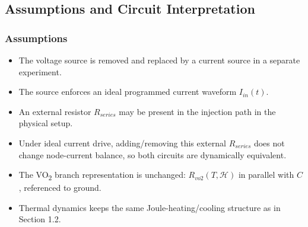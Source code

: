 \documentclass[11pt]{article}
\begin{document}
\subsection{Assumptions and Circuit Interpretation}
\subsubsection*{Assumptions}
\begin{itemize}
    \item The voltage source is removed and replaced by a current source in a separate experiment.
    \item The source enforces an ideal programmed current waveform \(I_{in}(t)\).
    \item An external resistor \(R_{series}\) may be present in the injection path in the physical setup.
    \item Under ideal current drive, adding/removing this external \(R_{series}\) does not change node-current balance, so both circuits are dynamically equivalent.
    \item The VO\textsubscript{2} branch representation is unchanged: \(R_{vo2}(T,\mathcal{H})\) in parallel with \(C\), referenced to ground.
    \item Thermal dynamics keeps the same Joule-heating/cooling structure as in Section 1.2.
\end{itemize}
\end{document}
